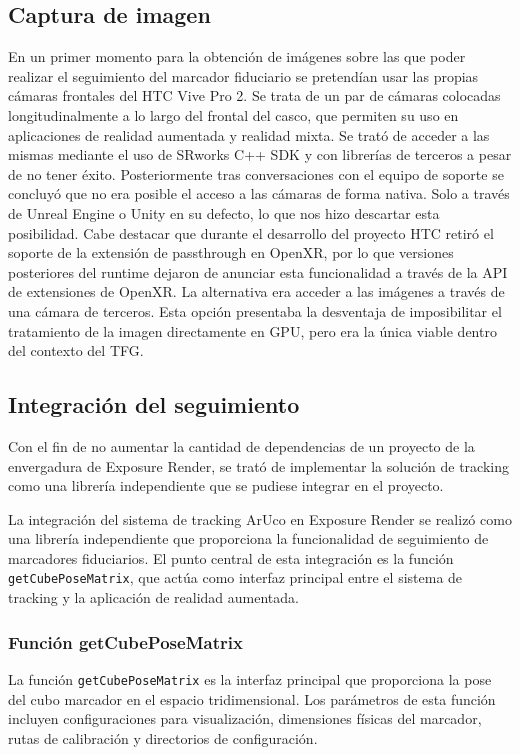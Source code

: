 \subsection{Captura de imagen}
\label{subsec:captura_imagen}
En un primer momento para la obtención de imágenes sobre las que poder realizar el seguimiento del marcador fiduciario se pretendían usar las propias cámaras frontales del HTC Vive Pro 2. Se trata de un par de cámaras colocadas longitudinalmente a lo largo del frontal del casco, que permiten su uso en aplicaciones de realidad aumentada y realidad mixta.
Se trató de acceder a las mismas mediante el uso de SRworks C++ SDK y con librerías de terceros a pesar de no tener éxito. Posteriormente tras conversaciones con el equipo de soporte se concluyó que no era posible el acceso a las cámaras de forma nativa. Solo a través de Unreal Engine o Unity en su defecto, lo que nos hizo descartar esta posibilidad. Cabe destacar que durante el desarrollo del proyecto HTC retiró el soporte de la extensión de passthrough en OpenXR, por lo que versiones posteriores del runtime dejaron de anunciar esta funcionalidad a través de la API de extensiones de OpenXR.
La alternativa era acceder a las imágenes a través de una cámara de terceros. Esta opción presentaba la desventaja de imposibilitar el tratamiento de la imagen directamente en GPU, pero era la única viable dentro del contexto del TFG.

\subsection{Integración del seguimiento}
Con el fin de no aumentar la cantidad de dependencias de un proyecto de la envergadura de Exposure Render, se trató de implementar la solución de tracking como una librería independiente que se pudiese integrar en el proyecto.

La integración del sistema de tracking ArUco en Exposure Render se realizó como una librería independiente que proporciona la funcionalidad de seguimiento de marcadores fiduciarios. El punto central de esta integración es la función \texttt{getCubePoseMatrix}, que actúa como interfaz principal entre el sistema de tracking y la aplicación de realidad aumentada.

\subsubsection{Función getCubePoseMatrix}
La función \texttt{getCubePoseMatrix} es la interfaz principal que proporciona la pose del cubo marcador en el espacio tridimensional. Los parámetros de esta función incluyen configuraciones para visualización, dimensiones físicas del marcador, rutas de calibración y directorios de configuración.

